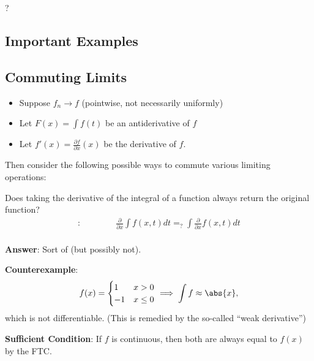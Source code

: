 \begin{corollary}

? 

\end{corollary}

\hypertarget{important-examples}{%
\subsection{Important Examples}\label{important-examples}}

\hypertarget{commuting-limits}{%
\subsection{Commuting Limits}\label{commuting-limits}}

\begin{itemize}
\tightlist
\item
  Suppose \(f_n \to f\) (pointwise, not necessarily uniformly)
\item
  Let \(F(x) = \int f(t)\) be an antiderivative of \(f\)
\item
  Let \(f'(x) = \frac{\partial f}{\partial x}(x)\) be the derivative of
  \(f\).
\end{itemize}

Then consider the following possible ways to commute various limiting
operations:

Does taking the derivative of the integral of a function always return
the original function?
\begin{align*}
[\frac{\partial}{\partial x}, \int dx]:\qquad\qquad \frac{\partial}{\partial x}\int f(x, t)dt =_? \int \frac{\partial}{\partial x} f(x, t)dt\\
\text{}
\end{align*}

\textbf{Answer}: Sort of (but possibly not).

\textbf{Counterexample}:
\begin{align*}
f(x) = 
\begin{cases}
1 & x > 0 \\ 
-1 & x \leq 0
\end{cases}
\implies \int f \approx \abs{x},
\end{align*} which is not differentiable. (This is remedied by the
so-called ``weak derivative'')

\textbf{Sufficient Condition}: If \(f\) is continuous, then both are
always equal to \(f(x)\) by the FTC.


